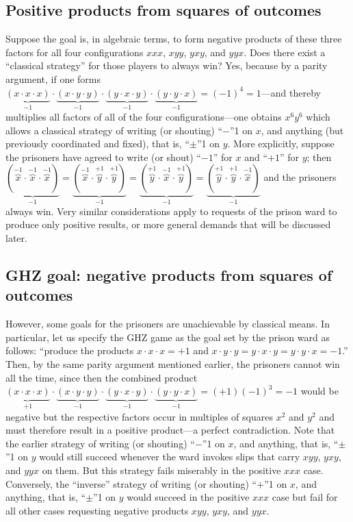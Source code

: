 \documentclass[sn-mathphys]{sn-jnl}%
\theoremstyle{thmstyleone}%
\theoremstyle{thmstyletwo}%
\theoremstyle{thmstylethree}%
\begin{document}
\subsection{Positive products from squares of outcomes}
Suppose the goal is, in algebraic terms, to form negative products of these three factors for all four configurations $xxx$, $xyy$, $yxy$, and $yyx$.
Does there exist a ``classical strategy'' for those players to always win? Yes, because by a parity argument, if one forms
$
\underbrace{(x \cdot x\cdot x)}_{-1}
\cdot
\underbrace{(x\cdot y\cdot y)}_{-1}
\cdot
\underbrace{(y\cdot x\cdot y)}_{-1}
\cdot
\underbrace{(y\cdot y\cdot x)}_{-1} = (-1)^4=1$---and
thereby multiplies all factors of all of the four configurations---one
obtains $x^6 y^6$ which allows a classical strategy of writing (or shouting)
``$-$''1 on $x$, and anything (but previously coordinated and fixed), that is, ``$\pm$''1 on $y$.
More explicitly, suppose the prisoners have agreed to write (or shout) ``$-1$'' for $x$ and ``$+1$'' for $y$;
then
$
\underbrace{(\overbrace{x}^{-1} \cdot \overbrace{x}^{-1}\cdot \overbrace{x}^{-1})}_{-1}
=
\underbrace{(\overbrace{x}^{-1}\cdot \overbrace{y}^{+1}\cdot \overbrace{y}^{+1})}_{-1}
=
\underbrace{(\overbrace{y}^{+1}\cdot \overbrace{x}^{-1}\cdot \overbrace{y}^{+1})}_{-1}
=
\underbrace{(\overbrace{y}^{+1}\cdot \overbrace{y}^{+1}\cdot \overbrace{x}^{-1})}_{-1}$
and the prisoners always win.
Very similar considerations apply to requests of the prison ward to produce only positive results,
or more general demands that will be discussed later.

\subsection{GHZ goal: negative products from squares of outcomes}
However, some goals for the prisoners are unachievable by classical means.
In particular, let us specify the GHZ game as the goal set by the prison ward as follows:
``produce the products
$x \cdot x\cdot x = +1$ and  $x\cdot y\cdot y=y\cdot x\cdot y=y\cdot y\cdot x=-1$.''
Then, by the same parity argument mentioned earlier, the prisoners cannot win all the time, since then the combined product
$
\underbrace{(x \cdot x\cdot x)}_{+1}
\cdot
\underbrace{(x\cdot y\cdot y)}_{-1}
\cdot
\underbrace{(y\cdot x\cdot y)}_{-1}
\cdot
\underbrace{(y\cdot y\cdot x)}_{-1}
=(+1)(-1)^3=-1$
would be negative but the respective factors occur in multiples of squares $x^2$ and $y^2$ and
must therefore result in a positive product---a perfect contradiction.
Note that the earlier strategy of writing (or shouting) ``$-$''1 on $x$, and anything, that is, ``$\pm$''1 on $y$
would still succeed whenever the ward invokes slips that carry $xyy$, $yxy$, and $yyx$ on them.
But this strategy fails miserably in the positive $xxx$ case.
Conversely, the ``inverse'' strategy  of writing (or shouting) ``$+$''1 on $x$, and anything, that is, ``$\pm$''1 on $y$
would succeed in the positive $xxx$ case
but fail for all other cases requesting negative products $xyy$, $yxy$, and $yyx$.
\end{document}
